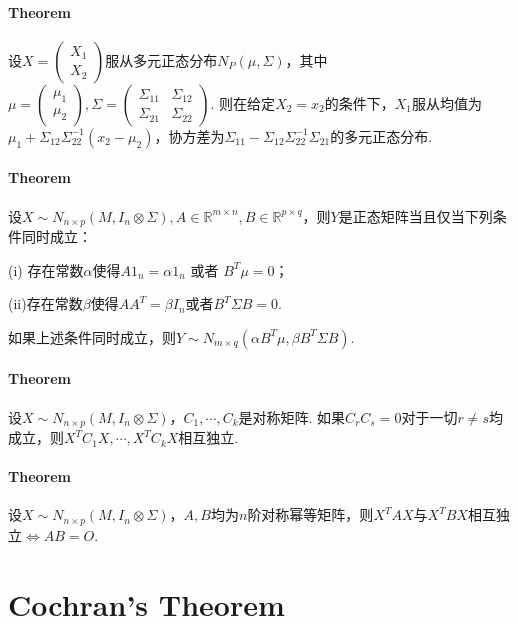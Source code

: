 \documentclass[a4paper,11pt]{article}
\begin{document}
\paragraph{Theorem} 
设$X = \begin{pmatrix} X_1\\ X_2 \end{pmatrix}$服从多元正态分布$N_P(\mu, \Sigma)$，其中$\mu = \begin{pmatrix} \mu_1 \\ \mu_2 \end{pmatrix}, \Sigma = \begin{pmatrix} \Sigma_{11} & \Sigma_{12}\\ \Sigma_{21} & \Sigma_{22} \end{pmatrix}$. 则在给定$X_2 = x_2$的条件下，$X_1$服从均值为$\mu_1 + \Sigma_{12}\Sigma_{22}^{-1}(x_2 - \mu_2)$，协方差为$\Sigma_{11} - \Sigma_{12}\Sigma_{22}^{-1}\Sigma_{21}$的多元正态分布. 

\paragraph{Theorem}
设$X\sim N_{n\times p}(M, I_n\otimes\Sigma), A\in\mathbb{R}^{m\times n}, B\in\mathbb{R}^{p\times q}$，则$Y$是正态矩阵当且仅当下列条件同时成立：

(i) 存在常数$\alpha$使得$A1_n = \alpha 1_n$ 或者 $B^T\mu = 0$；

(ii)存在常数$\beta$使得$AA^T = \beta I_n$或者$B^T\Sigma B = 0$. 

如果上述条件同时成立，则$Y\sim N_{m\times q}(\alpha B^T\mu, \beta B^T\Sigma B)$.

\paragraph{Theorem}
设$X\sim N_{n\times p}(M, I_n\otimes\Sigma)$，$C_1, \cdots , C_k$是对称矩阵. 如果$ C_rC_s = 0$对于一切$r\neq s$均成立，则$X^TC_1X, \cdots , X^TC_kX$相互独立.

\paragraph{Theorem}
设$X \sim N_{n\times p}(M, I_n\otimes\Sigma)$，$A, B$均为$n$阶对称幂等矩阵，则$X^TAX$与$X^TBX$相互独立$\Leftrightarrow AB = O$. 

\section{Cochran's Theorem}
\end{document}
